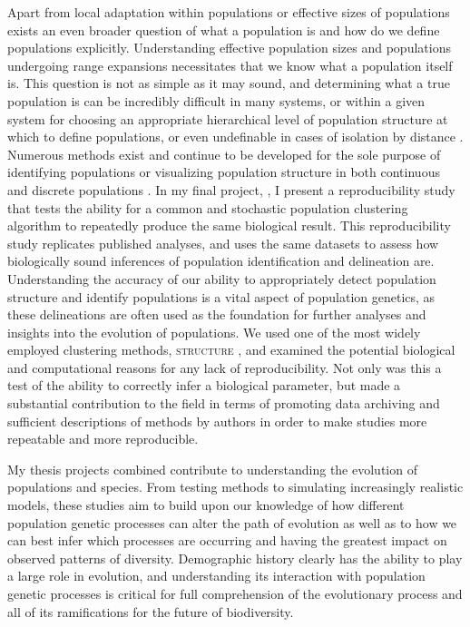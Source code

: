 Apart from local adaptation within populations or effective sizes of populations exists an even broader question of what a population is and how do we define populations explicitly. Understanding effective population sizes and populations undergoing range expansions necessitates that we know what a population itself is. This question is not as simple as it may sound, and determining what a true population is can be incredibly difficult in many systems, or within a given system for choosing an appropriate hierarchical level of population structure at which to define populations, or even undefinable in cases of isolation by distance \citep{Waples:2006}. Numerous methods exist and continue to be developed for the sole purpose of identifying populations or visualizing population structure in both continuous and discrete populations \citep{Pritchard:2000, Falush:2003, Falush:2007, Rosenberg:2004, Petkova:2015, Bradburd:2016}. In my final project, , I present a reproducibility study that tests the ability for a common and stochastic population clustering algorithm to repeatedly produce the same biological result. This reproducibility study replicates published analyses, and uses the same datasets to assess how biologically sound inferences of population identification and delineation are. Understanding the accuracy of our ability to appropriately detect population structure and identify populations is a vital aspect of population genetics, as these delineations are often used as the foundation for further analyses and insights into the evolution of populations. We used one of the most widely employed clustering methods, \textsc{structure} \citep{Pritchard:2000}, and examined the potential biological and computational reasons for any lack of reproducibility. Not only was this a test of the ability to correctly infer a biological parameter, but made a substantial contribution to the field in terms of promoting data archiving and sufficient descriptions of methods by authors in order to make studies more repeatable and more reproducible. 



My thesis projects combined contribute to understanding the evolution of populations and species. From testing methods to simulating increasingly realistic models, these studies aim to build upon our knowledge of how different population genetic processes can alter the path of evolution as well as to how we can best infer which processes are occurring and having the greatest impact on observed patterns of diversity. Demographic history clearly has the ability to play a large role in evolution, and understanding its interaction with population genetic processes is critical for full comprehension of the evolutionary process and all of its ramifications for the future of biodiversity.







